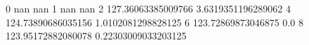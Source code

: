 0 nan nan
1 nan nan
2 127.36063385009766 3.6319351196289062
4 124.73890686035156 1.0102081298828125
6 123.72869873046875 0.0
8 123.95172882080078 0.22303009033203125
